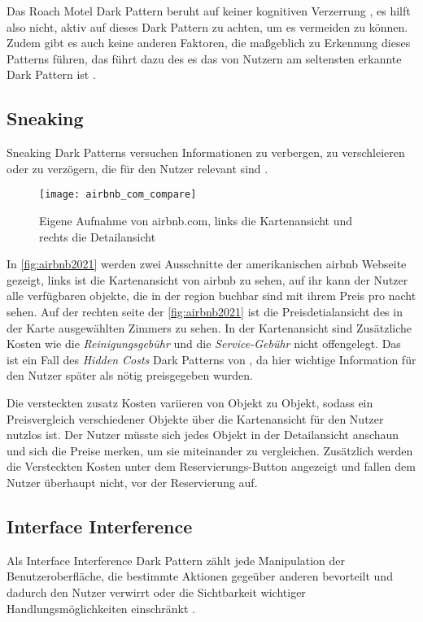 \documentclass[conference,compsoc,final,a4paper]{IEEEtran}
\begin{document}
Das Roach Motel Dark Pattern beruht auf keiner kognitiven Verzerrung \autocite{Mathur2019}, es hilft also nicht, aktiv auf dieses Dark Pattern zu achten, um es vermeiden zu können. Zudem gibt es auch keine anderen Faktoren, die maßgeblich zu Erkennung dieses Patterns führen, das führt dazu des es das von Nutzern am seltensten erkannte Dark Pattern ist \autocite{M.Bhoot2020}.
\subsection{Sneaking}
Sneaking Dark Patterns versuchen Informationen zu verbergen, zu verschleieren oder zu verzögern, die für den Nutzer relevant sind \autocite{Gray_2018}.

\begin{figure}[ht!]
  \centering
  \texttt{[image: airbnb\_com\_compare]}
  \caption{Eigene Aufnahme von airbnb.com, links die Kartenansicht und rechts die Detailansicht ~\autocite{airbnb2021}}
  \label{fig:airbnb2021}
\end{figure}

In \autoref{fig:airbnb2021} werden zwei Ausschnitte der amerikanischen airbnb Webseite gezeigt, links ist die Kartenansicht von airbnb zu sehen, auf ihr kann der Nutzer alle verfügbaren objekte, die in der region buchbar sind mit ihrem Preis pro nacht sehen. Auf der rechten seite der \autoref{fig:airbnb2021} ist die Preisdetialansicht des in der Karte ausgewählten Zimmers zu sehen. In der Kartenansicht sind Zusätzliche Kosten wie die \textit{Reinigungsgebühr} und die \textit{Service-Gebühr} nicht offengelegt. Das ist ein Fall des \textit{Hidden Costs} Dark Patterns von \autocite{Brignull} \autocite{Brignull}, da hier wichtige Information für den Nutzer später als nötig preisgegeben wurden.

Die versteckten zusatz Kosten variieren von Objekt zu Objekt, sodass ein Preisvergleich verschiedener Objekte über die Kartenansicht für den Nutzer nutzlos ist. Der Nutzer müsste sich jedes Objekt in der Detailansicht anschaun und sich die Preise merken, um sie miteinander zu vergleichen. Zusätzlich werden die Versteckten Kosten unter dem Reservierungs-Button angezeigt und fallen dem Nutzer überhaupt nicht, vor der Reservierung auf.

\subsection{Interface Interference}
Als Interface Interference Dark Pattern zählt jede Manipulation der Benutzeroberfläche, die bestimmte Aktionen gegeüber anderen bevorteilt und dadurch den Nutzer verwirrt oder die Sichtbarkeit wichtiger Handlungsmöglichkeiten einschränkt \autocite{Gray_2018}.
\end{document}
